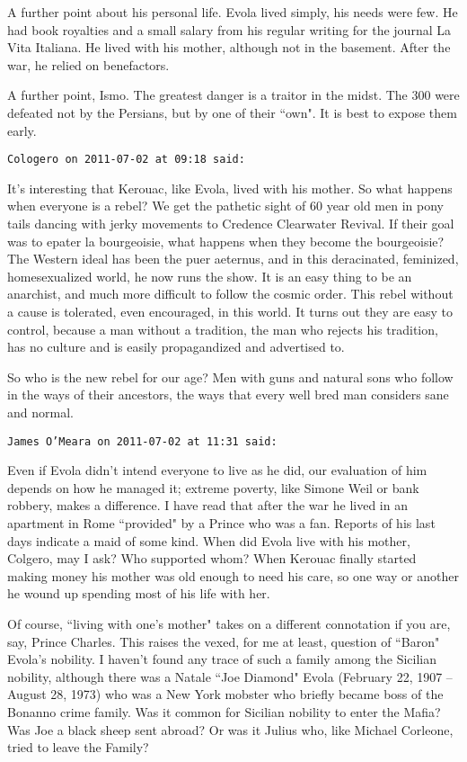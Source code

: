 \begin{footnotesize}
\begin{sffamily}
A further point about his personal life. Evola lived simply, his needs were few. He had book royalties and a small salary from his regular writing for the journal La Vita Italiana. He lived with his mother, although not in the basement. After the war, he relied on benefactors.

A further point, Ismo. The greatest danger is a traitor in the midst. The 300 were defeated not by the Persians, but by one of their ``own". It is best to expose them early.


\hfill

\texttt{Cologero on 2011-07-02 at 09:18 said: }

It's interesting that Kerouac, like Evola, lived with his mother. So what happens when everyone is a rebel? We get the pathetic sight of 60 year old men in pony tails dancing with jerky movements to Credence Clearwater Revival. If their goal was to epater la bourgeoisie, what happens when they become the bourgeoisie? The Western ideal has been the puer aeternus, and in this deracinated, feminized, homesexualized world, he now runs the show. It is an easy thing to be an anarchist, and much more difficult to follow the cosmic order. This rebel without a cause is tolerated, even encouraged, in this world. It turns out they are easy to control, because a man without a tradition, the man who rejects his tradition, has no culture and is easily propagandized and advertised to.

So who is the new rebel for our age? Men with guns and natural sons who follow in the ways of their ancestors, the ways that every well bred man considers sane and normal.


\hfill

\texttt{James O'Meara on 2011-07-02 at 11:31 said: }

Even if Evola didn't intend everyone to live as he did, our evaluation of him depends on how he managed it; extreme poverty, like Simone Weil or bank robbery, makes a difference. I have read that after the war he lived in an apartment in Rome ``provided" by a Prince who was a fan. Reports of his last days indicate a maid of some kind. When did Evola live with his mother, Colgero, may I ask? Who supported whom? When Kerouac finally started making money his mother was old enough to need his care, so one way or another he wound up spending most of his life with her. 

Of course, ``living with one's mother" takes on a different connotation if you are, say, Prince Charles. This raises the vexed, for me at least, question of ``Baron" Evola's nobility. I haven't found any trace of such a family among the Sicilian nobility, although there was a Natale ``Joe Diamond" Evola (February 22, 1907 – August 28, 1973) who was a New York mobster who briefly became boss of the Bonanno crime family. Was it common for Sicilian nobility to enter the Mafia? Was Joe a black sheep sent abroad? Or was it Julius who, like Michael Corleone, tried to leave the Family?



\end{sffamily}
\end{footnotesize}
